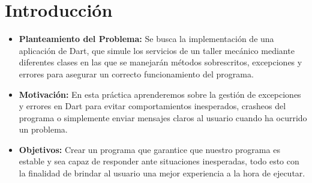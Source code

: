 \documentclass[letterpaper,12pt]{article}
\begin{document}
\tableofcontents
\clearpage

\section{Introducción}

\begin{itemize}
\item \textbf{Planteamiento del Problema:} Se busca la implementación de una aplicación de Dart, que simule los servicios de un taller mecánico mediante diferentes clases en las que se manejarán métodos sobrescritos, excepciones y errores para asegurar un correcto funcionamiento del programa.

\item \textbf{Motivación:} En esta práctica aprenderemos sobre la gestión de excepciones y errores en Dart para evitar comportamientos inesperados, crasheos del programa o simplemente enviar mensajes claros al usuario cuando ha ocurrido un problema.

\item \textbf{Objetivos:} Crear un programa que garantice que nuestro programa es estable y sea capaz de responder ante situaciones inesperadas, todo esto con la finalidad de brindar al usuario una mejor experiencia a la hora de ejecutar.

\end{itemize}
\end{document}
